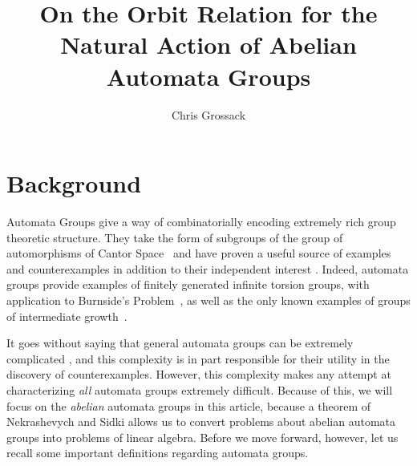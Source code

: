 \documentclass[12pt]{article}
\author{Chris Grossack}
\title{On the Orbit Relation for the Natural Action of Abelian Automata Groups}
\theoremstyle{definition}
\newcommand{\2}{\mathbf{2}}
\begin{document}
\maketitle

\begin{abstract}

\end{abstract}

\section{Background}

Automata Groups give a way of combinatorially encoding extremely rich
group theoretic structure. They take the form of subgroups of the group
of automorphisms of Cantor Space~\cite{NekrashevychSidki2004:AutomorphismsOfTheBinaryTree-HalfEndomorphisms}
and have proven a useful source of examples and counterexamples%
\cite{Nekrashevych2005:Self-SimilarGroups, Sidki2000:AutomorphismsOfOne-RootedTrees, GrigorchukNekrashevychSushchanski2000:AutomataDynamicalSystemsAndGroups}
in addition to their independent interest%
\cite{BondarenkoNekrashevychEtAl2009:GroupsGeneratedBy3StateAutomata, SutnerLewi2012:IteratingInvertibleBinaryTransducers, Sutner2018:AbelianAutomata, Grossack2019:FractionalElements}.
Indeed, automata groups provide examples of
finitely generated infinite torsion groups, with application to Burnside's
Problem~\cite{Gupta1983:OnTheBurnsideProblemForPeriodicGroups}, as well as
the only known examples of groups of intermediate growth~\cite{Grigorchuk2011:MilnorProblemOnGrowthOfGroups}.

It goes without saying that general automata groups can be extremely complicated%
\cite{BondarenkoNekrashevychEtAl2009:GroupsGeneratedBy3StateAutomata},
and this complexity is in part responsible for their utility in the discovery
of counterexamples. However, this complexity makes any attempt at 
characterizing \emph{all} automata groups extremely difficult. Because of this,
we will focus on the \emph{abelian} automata groups in this article, because
a theorem of Nekrashevych and Sidki%
\cite{NekrashevychSidki2004:AutomorphismsOfTheBinaryTree-HalfEndomorphisms}
allows us to convert problems about abelian automata groups into problems of
linear algebra. Before we move forward, however, let us recall some important 
definitions regarding automata groups.
\end{document}
